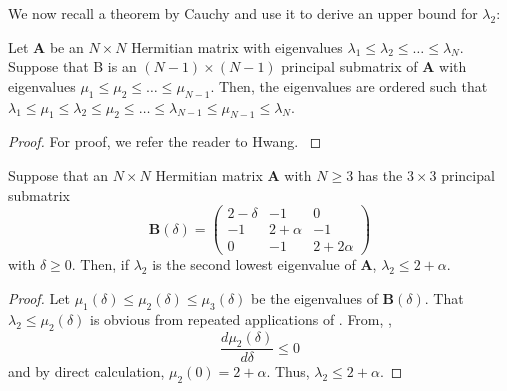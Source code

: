     We now recall a theorem by Cauchy and use it to derive an upper bound for $\lambda_2$:
    \begin{thm}\label{thm:Cauchy}
    	Let $\mathbf{A}$ be an $N\times N$ Hermitian matrix with eigenvalues $\lambda_1 \leq \lambda_2 \leq \dots \leq \lambda_N$. Suppose that B is an $(N-1)\times (N-1)$ principal submatrix of $\mathbf{A}$ with eigenvalues $\mu_1 \leq \mu_2 \leq \dots \leq \mu_{N-1}$. Then, the eigenvalues are ordered such that $\lambda_1 \leq \mu_1 \leq \lambda_2 \leq \mu_2 \leq \dots \leq \lambda_{N-1} \leq \mu_{N-1} \leq \lambda_N$.
    \end{thm}
    \begin{proof}
      For proof, we refer the reader to Hwang. \cite{Hwang2004}
    \end{proof}
    \begin{lem}\label{lem:upper}
    	Suppose that an $N \times N$ Hermitian matrix $\mathbf{A}$ with $N \geq 3$ has the $3\times 3$ principal submatrix
    	\[\mathbf{B}(\delta) = \left( \begin{array}{ccc}
	2 - \delta & -1 & 0 \\
	-1 & 2 + \alpha & -1 \\
	0 & -1 & 2 + 2\alpha
    	\end{array} \right) \]
    	with $\delta \geq 0$. Then, if $\lambda_2$ is the second lowest eigenvalue of $\mathbf{A}$, $\lambda_2 \leq 2 + \alpha$.
    \end{lem}
    \begin{proof}
    	Let $\mu_1(\delta) \leq \mu_2(\delta) \leq \mu_3(\delta)$ be the eigenvalues of $\mathbf{B}(\delta)$. That $\lambda_2 \leq \mu_2(\delta)$ is obvious from repeated applications of . From, ,
    	\begin{equation}
    		\frac{d \mu_2(\delta)}{d \delta} \leq 0
    	\end{equation}
    	and by direct calculation, $\mu_2(0) = 2 + \alpha$. Thus, $\lambda_2 \leq 2 + \alpha$.
    \end{proof}

